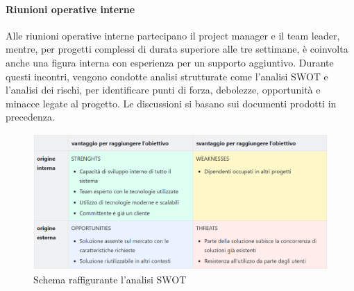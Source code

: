             \paragraph{Riunioni operative interne}
            Alle riunioni operative interne partecipano il project manager e il team leader, mentre, per progetti
            complessi di durata superiore alle tre settimane, è coinvolta anche una figura interna con esperienza
            per un supporto aggiuntivo. Durante questi incontri, vengono condotte analisi strutturate come l'analisi SWOT
            e l’analisi dei rischi, per identificare punti di forza, debolezze, opportunità e minacce legate al progetto.
            Le discussioni si basano sui documenti prodotti in precedenza.

            \begin{figure}
                \centering
                \includegraphics[width=\linewidth]{figures/swot.png}
                \caption{Schema raffigurante l'analisi SWOT}
                \label{fig:swot}
            \end{figure}
